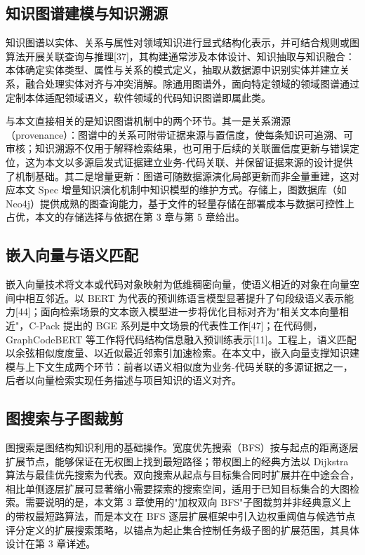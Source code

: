 \subsection{知识图谱建模与知识溯源}
知识图谱以实体、关系与属性对领域知识进行显式结构化表示，并可结合规则或图算法开展关联查询与推理[37]，其构建通常涉及本体设计、知识抽取与知识融合：本体确定实体类型、属性与关系的模式定义，抽取从数据源中识别实体并建立关系，融合处理实体对齐与冲突消解。除通用图谱外，面向特定领域的领域图谱通过定制本体适配领域语义，软件领域的代码知识图谱即属此类。

与本文直接相关的是知识图谱机制中的两个环节。其一是关系溯源（provenance）：图谱中的关系可附带证据来源与置信度，使每条知识可追溯、可审核；知识溯源不仅用于解释检索结果，也可用于后续的关联置信度更新与错误定位，这为本文以多源启发式证据建立业务-代码关联、并保留证据来源的设计提供了机制基础。其二是增量更新：图谱可随数据源演化局部更新而非全量重建，这对应本文 Spec 增量知识演化机制中知识模型的维护方式。存储上，图数据库（如 Neo4j）提供成熟的图查询能力，基于文件的轻量存储在部署成本与数据可控性上占优，本文的存储选择与依据在第 3 章与第 5 章给出。


\subsection{嵌入向量与语义匹配}
嵌入向量技术将文本或代码对象映射为低维稠密向量，使语义相近的对象在向量空间中相互邻近。以 BERT 为代表的预训练语言模型显著提升了句段级语义表示能力[44]；面向检索场景的文本嵌入模型进一步将优化目标对齐为"相关文本向量相近"，C-Pack 提出的 BGE 系列是中文场景的代表性工作[47]；在代码侧，GraphCodeBERT 等工作将代码结构信息融入预训练表示[11]。工程上，语义匹配以余弦相似度度量、以近似最近邻索引加速检索。在本文中，嵌入向量支撑知识建模与上下文生成两个环节：前者以语义相似度为业务-代码关联的多源证据之一，后者以向量检索实现任务描述与项目知识的语义对齐。


\subsection{图搜索与子图裁剪}
图搜索是图结构知识利用的基础操作。宽度优先搜索（BFS）按与起点的距离逐层扩展节点，能够保证在无权图上找到最短路径；带权图上的经典方法以 Dijkstra 算法与最佳优先搜索为代表。双向搜索从起点与目标集合同时扩展并在中途会合，相比单侧逐层扩展可显著缩小需要探索的搜索空间，适用于已知目标集合的大图检索。需要说明的是，本文第 3 章使用的"加权双向 BFS"子图裁剪并非经典意义上的带权最短路算法，而是本文在 BFS 逐层扩展框架中引入边权重阈值与候选节点评分定义的扩展搜索策略，以锚点为起止集合控制任务级子图的扩展范围，其具体设计在第 3 章详述。


